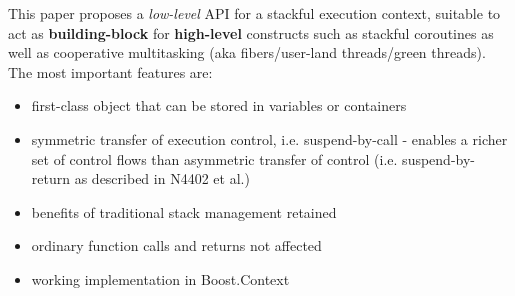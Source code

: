 This paper proposes a \emph{low-level} API for a stackful execution context,
suitable to act as {\bfseries building-block} for {\bfseries high-level}
constructs such as stackful coroutines as well as cooperative
multitasking (aka fibers/user-land threads/green threads).\\
\newline
The most important features are:
\begin{itemize}
    \item first-class object that can be stored in variables or containers
    \item symmetric transfer of execution control, i.e. suspend-by-call -
          enables a richer set of control flows than asymmetric transfer of
          control (i.e. suspend-by-return as described in N4402\cite{N4402} et al.)
    \item benefits of traditional stack management retained
    \item ordinary function calls and returns not affected
    \item working implementation in Boost.Context\cite{bcontext}
\end{itemize}
